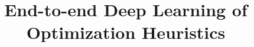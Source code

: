 \documentclass[pageno,hidelinks]{jpaper}
\author{}
\begin{document}
\title{End-to-end Deep Learning of Optimization Heuristics}

\date{}
\maketitle

\thispagestyle{empty}
\end{document}
